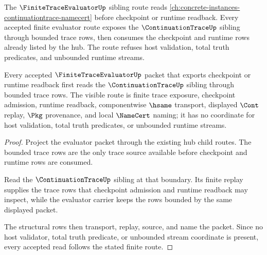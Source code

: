 The $\FiniteTraceEvaluatorUp$ sibling route reads \autoref{ch:concrete-instances-continuationtrace-namecert} before checkpoint or runtime readback. Every accepted finite evaluator route exposes the $\ContinuationTraceUp$ sibling through bounded trace rows, then consumes the checkpoint and runtime rows already listed by the hub. The route refuses host validation, total truth predicates, and unbounded runtime streams.

\begin{theorem}
\label{thm:finitetraceevaluator-continuation-trace-route}
Every accepted $\FiniteTraceEvaluatorUp$ packet that exports checkpoint or runtime readback first reads the $\ContinuationTraceUp$ sibling through bounded trace rows. The visible route is finite trace exposure, checkpoint admission, runtime readback, componentwise $\hsame$ transport, displayed $\Cont$ replay, $\Pkg$ provenance, and local $\NameCert$ naming; it has no coordinate for host validation, total truth predicates, or unbounded runtime streams.
\end{theorem}

\begin{proof}
Project the evaluator packet through the existing hub child routes. The bounded trace rows are the only trace source available before checkpoint and runtime rows are consumed.

Read the $\ContinuationTraceUp$ sibling at that boundary. Its finite replay supplies the trace rows that checkpoint admission and runtime readback may inspect, while the evaluator carrier keeps the rows bounded by the same displayed packet.

The structural rows then transport, replay, source, and name the packet. Since no host validator, total truth predicate, or unbounded stream coordinate is present, every accepted read follows the stated finite route.
\end{proof}
